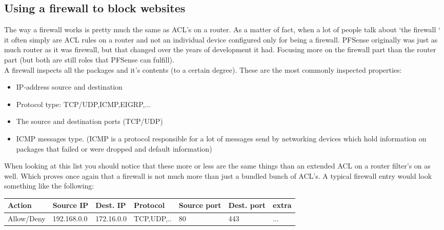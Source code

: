 \subsection{Using a firewall to block websites}
The way a firewall works is pretty much the same as ACL's on a router. As a matter of fact, when a lot of people talk about `the firewall ` it often simply are ACL rules on a router and not an individual device configured only for being a firewall. PFSense originally was just as much router as it was firewall, but that changed over the years of development it had. Focusing more on the firewall part than the router part (but both are still roles that PFSense can fulfill).\\
A firewall inspects all the packages and it's contents (to a certain degree). These are the most commonly inspected properties:
\begin{itemize}
\item IP-address source and destination
\item Protocol type: TCP/UDP,ICMP,EIGRP,...
\item The source and destination ports (TCP/UDP)
\item ICMP messages type. (ICMP is a protocol responsible for a lot of messages send by networking devices which hold information on packages that failed or were dropped and default information)
\end{itemize}
When looking at this list you should notice that these more or less are the same things than an extended ACL on a router filter's on as well. Which proves once again that a firewall is not much more than just a bundled bunch of ACL's. A typical firewall entry would look something like the following:\\

\begin{tabu} to \textwidth { | X[l] | X[l] |X[l] |X[l] |X[l] |X[l] |X[l] | } 
\hline

\textbf{ Action}& \textbf{Source IP} & \textbf{ Dest. IP} & \textbf{ Protocol} & \textbf{Source port} & \textbf{ Dest. port} & \textbf{extra} \\ 
\hline
\small Allow/Deny& \small 192.168.0.0  & \small  172.16.0.0 & \small  TCP,UDP,.. & \small  80 & \small  443 & ... \\ 
\hline
\end{tabu}
\\

